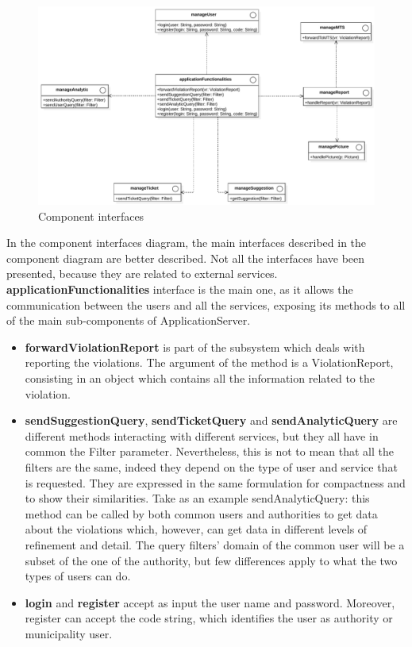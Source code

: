 \documentclass[./main.tex]{subfiles}
\begin{document}
\begin{figure}[H]
\centering
\includegraphics[width=\textwidth]{resources/interfaces_diagram}
\caption{Component interfaces}
\label{fig:interfaces}
\end{figure}

In the component interfaces diagram, the main interfaces described in the component diagram are better described. Not all the interfaces have been presented, because they are related to external services.\medskip\\
\textbf{applicationFunctionalities} interface is the main one, as it allows the communication between the users and all the services, exposing its methods to all of the main sub-components of ApplicationServer.
 
\begin{itemize}
\item
	\textbf{forwardViolationReport} is part of the subsystem which deals with reporting the violations. The argument of the method is a ViolationReport, consisting in an object which contains all the information related to the violation.
	
\item
	\textbf{sendSuggestionQuery}, \textbf{sendTicketQuery} and \textbf{sendAnalyticQuery} are different methods interacting with different services, but they all have in common the Filter parameter. Nevertheless, this is not to mean that all the filters are the same, indeed they depend on the type of user and service that is requested. They are expressed in the same formulation for compactness and to show their similarities. Take as an example sendAnalyticQuery: this method can be called by both common users and authorities to get data about the violations which, however, can get data in different levels of refinement and detail. The query filters' domain of the common user will be a subset of the one of the authority, but few differences apply to what the two types of users can do.
	
\item
	\textbf{login} and \textbf{register} accept as input the user name and password. Moreover, register can accept the code string, which identifies the user as authority or municipality user.
	
\end{itemize}
\end{document}
